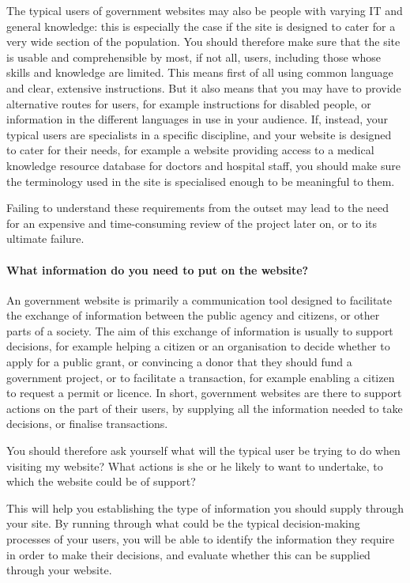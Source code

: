 The typical users of government websites may also be people with varying IT and general knowledge: this is especially the case if the site is designed to cater for a very wide section of the population. You should therefore make sure that the site is usable and comprehensible by most, if not all, users, including those whose skills and knowledge are limited. This means first of all using common language and clear, extensive instructions. But it also means that you may have to provide alternative routes for users, for example instructions for disabled people, or information in the different languages in use in your audience. If, instead, your typical users are specialists in a specific discipline, and your website is designed to cater for their needs, for example a website providing access to a medical knowledge resource database for doctors and hospital staff, you should make sure the terminology used in the site is specialised enough to be meaningful to them.

Failing to understand these requirements from the outset may lead to the need for an expensive and time-consuming review of the project later on, or to its ultimate failure.

\paragraph{What information do you need to put on the website?}

An government website is primarily a communication tool designed to facilitate the exchange of information between the public agency and citizens, or other parts of a society. The aim of this exchange of information is usually to support decisions, for example helping a citizen or an organisation to decide whether to apply for a public grant, or convincing a donor that they should fund a government project, or to facilitate a transaction, for example enabling a citizen to request a permit or licence. In short, government websites are there to support actions on the part of their users, by supplying all the information needed to take decisions, or finalise transactions.

You should therefore ask yourself what will the typical user be trying to do when visiting my website? What actions is she or he likely to want to undertake, to which the website could be of support?

This will help you establishing the type of information you should supply through your site. By running through what could be the typical decision-making processes of your users, you will be able to identify the information they require in order to make their decisions, and evaluate whether this can be supplied through your website.

